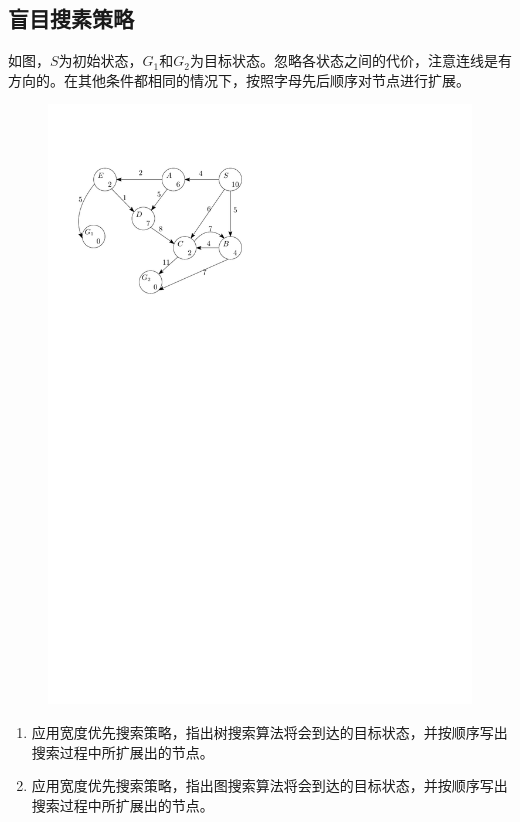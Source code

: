 \subsection{盲目搜素策略}
\begin{example}
    如图，$S$为初始状态，$G_1$和$G_2$为目标状态。忽略各状态之间的代价，注意连线是有方向的。在其他条件都相同的情况下，按照字母先后顺序对节点进行扩展。
    \begin{figure}[htbp]
        \centering
        \includegraphics{image/搜索策略例题.pdf}
    \end{figure}
    \begin{enumerate}
        \item 应用\textcolor{main1}{宽度优先搜索}策略，指出\textcolor{main1}{树搜索}算法将会到达的目标状态，并按顺序写出搜索过程中所扩展出的节点。
        \item 应用\textcolor{main1}{宽度优先搜索}策略，指出\textcolor{main1}{图搜索}算法将会到达的目标状态，并按顺序写出搜索过程中所扩展出的节点。
    \end{enumerate}
    

\end{example}

